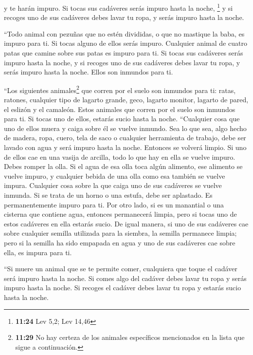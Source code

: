 y te harán impuro. Si tocas sus cadáveres serás impuro
hasta la noche, \footnote{\textbf{11:24} Lev 5,2; Lev 14,46}
 y si recoges uno de sus cadáveres debes lavar tu ropa, y
serás impuro hasta la noche.

 ``Todo animal con pezuñas que no estén divididas, o que
no mastique la baba, es impuro para ti. Si tocas alguno de ellos serás
impuro.  Cualquier animal de cuatro patas que camine
sobre sus patas es impuro para ti. Si tocas sus cadáveres serás impuro
hasta la noche,  y si recoges uno de sus cadáveres debes
lavar tu ropa, y serás impuro hasta la noche. Ellos son inmundos para
ti.

 ``Los siguientes animales\footnote{\textbf{11:29} No hay
  certeza de los animales específicos mencionados en la lista que sigue
  a continuación.} que corren por el suelo son inmundos para ti: ratas,
ratones, cualquier tipo de lagarto grande,  geco, lagarto
monitor, lagarto de pared, el eslizón y el camaleón. 
Estos animales que corren por el suelo son inmundos para ti. Si tocas
uno de ellos, estarás sucio hasta la noche.  ``Cualquier
cosa que uno de ellos muera y caiga sobre él se vuelve inmundo. Sea lo
que sea, algo hecho de madera, ropa, cuero, tela de saco o cualquier
herramienta de trabajo, debe ser lavado con agua y será impuro hasta la
noche. Entonces se volverá limpio.  Si uno de ellos cae
en una vasija de arcilla, todo lo que hay en ella se vuelve impuro.
Debes romper la olla.  Si el agua de esa olla toca algún
alimento, ese alimento se vuelve impuro, y cualquier bebida de una olla
como esa también se vuelve impura.  Cualquier cosa sobre
la que caiga uno de sus cadáveres se vuelve inmunda. Si se trata de un
horno o una estufa, debe ser aplastado. Es permanentemente impuro para
ti.  Por otro lado, si es un manantial o una cisterna que
contiene agua, entonces permanecerá limpia, pero si tocas uno de estos
cadáveres en ella estarás sucio.  De igual manera, si uno
de sus cadáveres cae sobre cualquier semilla utilizada para la siembra,
la semilla permanece limpia;  pero si la semilla ha sido
empapada en agua y uno de sus cadáveres cae sobre ella, es impura para
ti.

 ``Si muere un animal que se te permite comer, cualquiera
que toque el cadáver será impuro hasta la noche.  Si
comes algo del cadáver debes lavar tu ropa y serás impuro hasta la
noche. Si recoges el cadáver debes lavar tu ropa y estarás sucio hasta
la noche.

